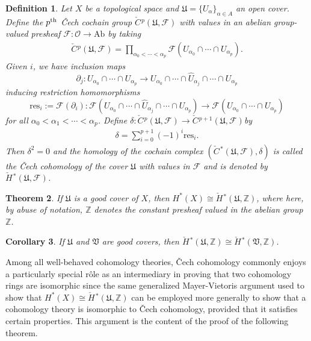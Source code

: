 \documentclass{amsart}          %
\newcommand{\Z}{{\mathbb{Z}}}
\newtheorem{theorem}{Theorem}
\newtheorem{corollary}[theorem]{Corollary}
\newtheorem{definition}[theorem]{Definition}
\newcommand{\res}{\mathrm{res}}
\begin{document}
\begin{definition}
	Let $X$ be a topological space and $\mathfrak{U}=\{U_\alpha\}_{\alpha\in A}$ an open cover. Define the $p^\textup{th}$ \v{C}ech cochain group $\check{C}{\hspace{1pt}}^p(\mathfrak{U},\mathscr{F})$ with values in an abelian group-valued presheaf $\mathscr{F}:\mathscr{O}\to\mathrm{Ab}$ by taking\begin{align*}
	\check{C}{\hspace{1pt}}^p(\mathfrak{U},\mathscr{F})=\prod_{\alpha_0<\cdots<\alpha_p}\mathscr{F}(U_{\alpha_0}\cap\cdots\cap U_{\alpha_p}).
	\end{align*}Given $i$, we have inclusion maps $$\partial_j:U_{\alpha_0}\cap\cdots\cap U_{\alpha_p}\to U_{\alpha_0}\cap\cdots\cap\widehat{U}_{\alpha_j}\cap\cdots\cap U_{\alpha_p}$$ inducing restriction homomorphisms $$\res_i:=\mathscr{F}(\partial_i):\mathscr{F}(U_{\alpha_0}\cap\cdots\cap\widehat{U}_{\alpha_j}\cap\cdots\cap U_{\alpha_p})\to\mathscr{F}(U_{\alpha_0}\cap\cdots\cap U_{\alpha_p})$$ for all $\alpha_0<\alpha_1<\cdots<\alpha_p$. Define $\delta:\check{C}{\hspace{1pt}}^p(\mathfrak{U},\mathscr{F})\to\check{C}{\hspace{1pt}}^{p+1}(\mathfrak{U},\mathscr{F})$by\begin{align*}
	\delta=\sum_{i=0}^{p+1}(-1)^i\res_i.
	\end{align*}Then $\delta^2=0$ and the homology of the cochain complex $(\check{C}{\hspace{1pt}}^*(\mathfrak{U},\mathscr{F}),\delta)$ is called the \textup{\v{C}ech cohomology} of the cover $\mathfrak{U}$ with values in $\mathscr{F}$ and is denoted by $\check{H}{\hspace{1pt}}^*(\mathfrak{U},\mathscr{F})$.
\end{definition}
\begin{theorem}
	If $\mathfrak{U}$ is a good cover of $X$, then $H^*(X)\cong\check{H}{\hspace{1pt}}^*(\mathfrak{U},\Z)$, where here, by abuse of notation, $\Z$ denotes the constant presheaf valued in the abelian group $\Z$.
\end{theorem}
\begin{corollary}
	If $\mathfrak{U}$ and $\mathfrak{V}$ are good covers, then $\check{H}{\hspace{1pt}}^*(\mathfrak{U},\Z)\cong \check{H}{\hspace{1pt}}^*(\mathfrak{V},\Z)$.
\end{corollary}
Among all well-behaved cohomology theories, \v{C}ech cohomology commonly enjoys a particularly special r\^{o}le as an intermediary in proving that two cohomology rings are isomorphic since the same \textup{generalized Mayer-Vietoris argument} used to show that $H^*(X)\cong\check{H}{\hspace{1pt}}^*(\mathfrak{U},\Z)$ can be employed more generally to show that a cohomology theory is isomorphic to \v{C}ech cohomology, provided that it satisfies certain properties. This argument is the content of the proof of the following theorem.
\end{document}
